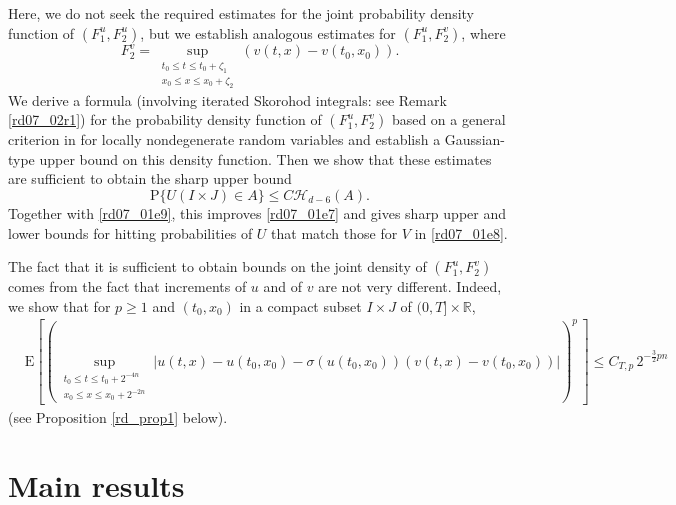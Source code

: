 \documentclass[12pt,a4paper]{article}
\newcommand{\R}{{\mathbb{R}}}
\newcommand{\E}{\mathrm{E}}
\renewcommand{\P}{\mathrm{P}}
\newcommand{\<}{\langle}
\renewcommand{\>}{\rangle}
\begin{document}
Here, we do not seek the required estimates for the joint probability density function of $(F_1^u, F_2^u)$, but we establish analogous estimates for $(F_1^u, F_2^v)$, where
\begin{equation*}
   F_2^v=  \sup _{\substack {t_0\le t \le t_0+\zeta_1 \\ x_0\le x \le x_0+\zeta_2}}
(v(t,x)-v(t_0,x_0)).
\end{equation*}
We derive a formula (involving iterated Skorohod integrals: see Remark \ref{rd07_02r1}) for the probability density function of $(F_1^u, F_2^v)$ based on a general criterion in \cite{fn}  for locally nondegenerate random variables and establish a Gaussian-type upper bound on this density function. 
Then we show that these estimates are sufficient to obtain the sharp upper bound
\begin{equation*}\label{rd04_08e9}
       \P\{U(I \times J) \in A \} \leq C \mathscr{H}_{d-6}(A).
\end{equation*}
Together with \eqref{rd07_01e9}, this improves \eqref{rd07_01e7} and gives sharp upper and lower bounds for hitting probabilities of $U$ that match those for $V$ in \eqref{rd07_01e8}. 

The fact that it is sufficient to obtain bounds on the joint density of $(F_1^u, F_2^v)$ comes from the fact that increments of $u$ and of $v$ are not very different. Indeed, we show that for $p \geq 1$ and $(t_0, x_0)$ in a compact subset $I\times J$ of $(0, T] \times \R$, 
\begin{align*}
    &\E\left[\left( \sup_{\substack {t_0\le t \le t_0+2^{-4n} \\ x_0\le x \le x_0+2^{-2n}}} |u(t,x)-u(t_0,x_0) - \sigma(u(t_0,x_0))(v(t,x)-v(t_0,x_0))| \right)^p\, \right]
    \leq C_{T,p}\,  2^{-\frac 32 pn}
\end{align*}
(see Proposition \ref{rd_prop1} below).

\section{Main results}
\end{document}
